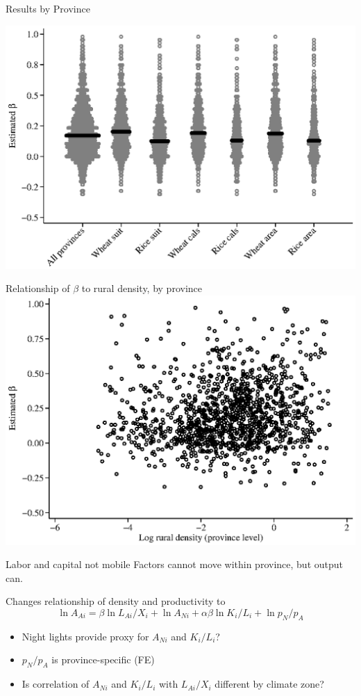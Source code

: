 \documentclass[10pt, xcolor=dvipsnames]{beamer}
\begin{document}
\begin{frame}{Results by Province}
\begin{center}
\includegraphics[width=.8\textwidth]{fig_beta_province.eps}
\end{center}
\end{frame}

\begin{frame}{Relationship of $\beta$ to rural density, by province}\label{rurdbeta}
\includegraphics[width=.8\textwidth]{fig_beta_rurd.eps}
\hfill \hyperlink{eos}{}
\end{frame}

\begin{frame}{Labor and capital not mobile}\label{nonmobile}
Factors cannot move within province, but output can.

\vspace{.2cm} Changes relationship of density and productivity to
\begin{equation}
  \ln A_{Ai} = \beta \ln L_{Ai}/X_i + \ln A_{Ni} + \alpha\beta \ln K_i/L_i + \ln p_N/p_A \nonumber
\end{equation}
\begin{itemize}
  \item Night lights provide proxy for $A_{Ni}$ and $K_i/L_i$?
  \item $p_N/p_A$ is province-specific (FE)
  \item Is correlation of $A_{Ni}$ and $K_i/L_i$ with $L_{Ai}/X_i$ different by climate zone?
\end{itemize}

\hfill \hyperlink{robustness}{}
\end{frame}
\end{document}
